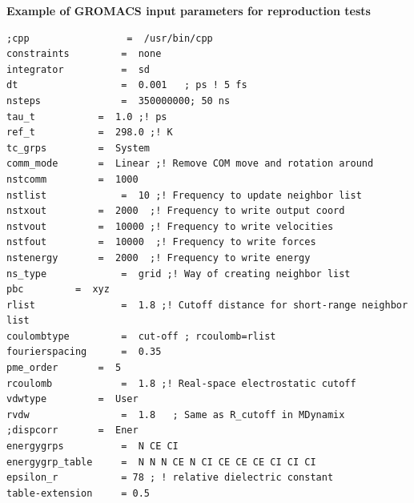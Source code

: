 \documentclass[10pt,a4paper,twoside]{article}
\begin{document}
\textbf{Example of GROMACS input parameters for reproduction tests}

\begin{lstlisting}[frame=single]
;cpp                 =  /usr/bin/cpp
constraints         =  none
integrator          =  sd
dt                  =  0.001   ; ps ! 5 fs
nsteps              =  350000000; 50 ns 
tau_t 		    =  1.0 ;! ps
ref_t		    =  298.0 ;! K
tc_grps		    =  System
comm_mode	    =  Linear ;! Remove COM move and rotation around
nstcomm		    =  1000
nstlist             =  10 ;! Frequency to update neighbor list
nstxout		    =  2000  ;! Frequency to write output coord
nstvout		    =  10000 ;! Frequency to write velocities 
nstfout		    =  10000  ;! Frequency to write forces
nstenergy	    =  2000  ;! Frequency to write energy
ns_type             =  grid ;! Way of creating neighbor list
pbc		    =  xyz
rlist               =  1.8 ;! Cutoff distance for short-range neighbor list
coulombtype         =  cut-off ; rcoulomb=rlist
fourierspacing	    =  0.35 
pme_order	    =  5
rcoulomb            =  1.8 ;! Real-space electrostatic cutoff
vdwtype		    =  User
rvdw                =  1.8   ; Same as R_cutoff in MDynamix
;dispcorr 	    =  Ener
energygrps          =  N CE CI 
energygrp_table     =  N N N CE N CI CE CE CE CI CI CI
epsilon_r           = 78 ; ! relative dielectric constant
table-extension     = 0.5
\end{lstlisting}
\end{document}
